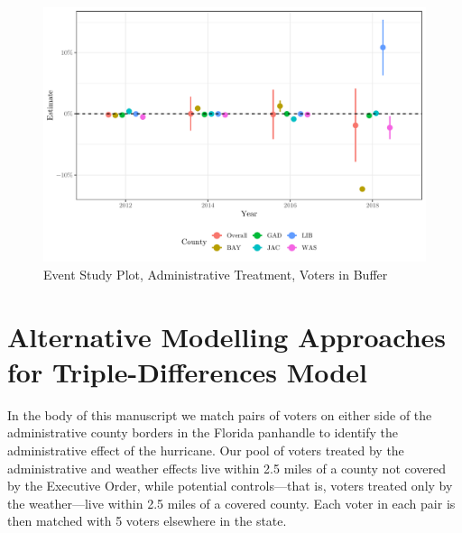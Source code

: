 \documentclass[
  12pt,
]{article}
\begin{document}
\begin{figure}[H]

{\centering \includegraphics{si_files/figure-latex/es2-1} 

}

\caption{\label{fig:es-2}Event Study Plot, Administrative Treatment, Voters in Buffer}\label{fig:es2}
\end{figure}

\hypertarget{alternative-modelling-approaches-for-triple-differences-model}{%
\section*{Alternative Modelling Approaches for Triple-Differences Model}\label{alternative-modelling-approaches-for-triple-differences-model}}

In the body of this manuscript we match pairs of voters on either side of the administrative county borders in the Florida panhandle to identify the administrative effect of the hurricane. Our pool of voters treated by the administrative and weather effects live within 2.5 miles of a county not covered by the Executive Order, while potential controls---that is, voters treated only by the weather---live within 2.5 miles of a covered county. Each voter in each pair is then matched with 5 voters elsewhere in the state.
\end{document}
